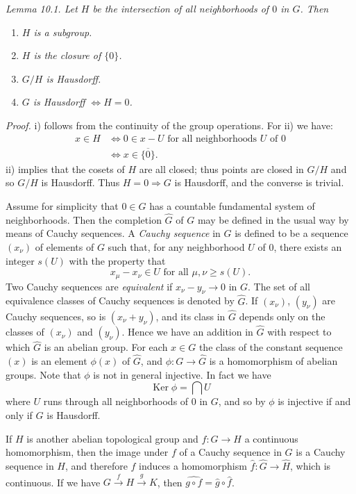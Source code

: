 \noindent\textit{Lemma 10.1. Let $H$ be the intersection of all neighborhoods of $0$ in $G$. Then}
\begin{enumerate}
\renewcommand{\labelenumi}{\roman{enumi})}
\item \textit{$H$ is a subgroup.}
\item \textit{$H$ is the closure of $\{0\}$.}
\item \textit{$G/H$ is Hausdorff.}
\item \textit{$G$ is Hausdorff $\Longleftrightarrow H=0$.}
\end{enumerate}

\noindent\textit{Proof.} i) follows from the continuity of the group operations. For ii) we have:
\[
\begin{aligned}
x\in H&\Longleftrightarrow0\in x-U\text{ for all neighborhoods }U\text{ of }0\\
&\Longleftrightarrow x\in\overline{\{0\}}.
\end{aligned}
\]
ii) implies that the cosets of $H$ are all closed; thus points are closed in $G/H$ and so $G/H$ is Hausdorff. Thus $H=0\Rightarrow G$ is Hausdorff, and the converse is trivial. \proofbox

Assume for simplicity that $0\in G$ has a countable fundamental system of neighborhoods. Then the completion $\widehat G$ of $G$ may be defined in the usual way by means of Cauchy sequences. A \textit{Cauchy sequence} in $G$ is defined to be a sequence $(x_\nu)$ of elements of $G$ such that, for any neighborhood $U$ of $0$, there exists an integer $s(U)$ with the property that
\[
 x_\mu-x_\nu\in U\text{ for all }\mu,\nu\geq s(U).
\]
Two Cauchy sequences are \textit{equivalent} if $x_\nu-y_\nu\longrightarrow0$ in $G$. The set of all equivalence classes of Cauchy sequences is denoted by $\widehat G$. If $(x_\nu)$, $(y_\nu)$ are Cauchy sequences, so is $(x_\nu+y_\nu)$, and its class in $\widehat G$ depends only on the classes of $(x_\nu)$ and $(y_\nu)$. Hence we have an addition in $\widehat G$ with respect to which $\widehat G$ is an abelian group. For each $x\in G$ the class of the constant sequence $(x)$ is an element $\phi(x)$ of $\widehat G$, and $\phi:G\longrightarrow\widehat G$ is a homomorphism of abelian groups. Note that $\phi$ is not in general injective. In fact we have
\[
 \operatorname{Ker}\phi=\bigcap U
\]
where $U$ runs through all neighborhoods of $0$ in $G$, and so by  $\phi$ is injective if and only if $G$ is Hausdorff.

If $H$ is another abelian topological group and $f:G\longrightarrow H$ a continuous homomorphism, then the image under $f$ of a Cauchy sequence in $G$ is a Cauchy sequence in $H$, and therefore $f$ induces a homomorphism $\widehat f:\widehat G\longrightarrow\widehat H$, which is continuous. If we have $G\xrightarrow{f}H\xrightarrow{g}K$, then $\widehat{g\circ f}=\widehat g\circ\widehat f$.

